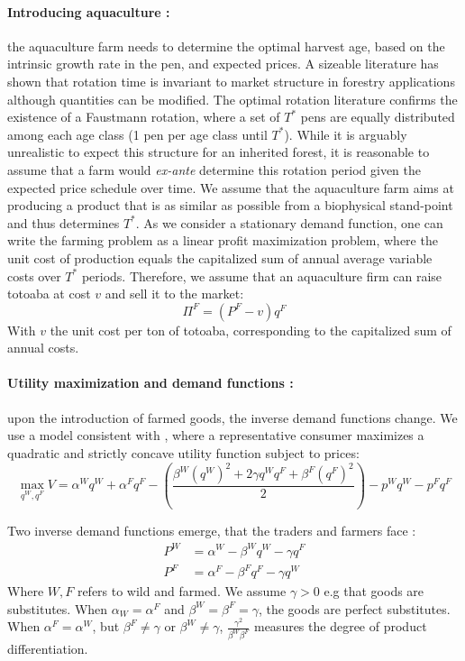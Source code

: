 \paragraph{Introducing aquaculture :}
\label{subsec:aquaculture}
the aquaculture farm needs to determine the optimal harvest age, based on the intrinsic growth rate in the pen, and expected prices. A sizeable literature has shown that rotation time is invariant to market structure in forestry applications \citep{faustmann1849, mitra_faustmann_1986} although quantities can be modified. The optimal rotation literature confirms the existence of a Faustmann rotation, where a set of $T^*$ pens are equally distributed among each age class (1 pen per age class until $T^*$). While it is arguably unrealistic to expect this structure for an inherited forest, it is reasonable to assume that a farm would \textit{ex-ante} determine this rotation period given the expected price schedule over time. We assume that the aquaculture farm aims at producing a product that is as similar as possible from a biophysical stand-point and thus determines $T^*$.
As we consider a stationary demand function, one can write the farming problem as a linear profit maximization problem, where the unit cost of production equals the capitalized sum of annual average variable costs over $T^*$ periods. 
Therefore, we assume that an aquaculture firm can raise totoaba at cost $v$ and sell it to the market: 
\begin{equation}
    \Pi^F = (P^F- v)q^F
    \label{eq:profit_aquaculture}
\end{equation}
With $v$ the unit cost per ton of totoaba, corresponding to the capitalized sum of annual costs. 
%
\paragraph{Utility maximization and demand functions :}
upon the introduction of farmed goods, the inverse demand functions change. 
We use a model consistent with \citep{singh_price_1984}, where a representative consumer maximizes  a quadratic and strictly concave utility function subject to prices: 
\begin{equation}
    \max_{q^W, q^F}V = \alpha^W q^W + \alpha^F q^F - \left(\frac{\beta^W (q^W)^2 + 2\gamma q^W q^F +\beta^F (q^F)^2}{2}\right) - p^Wq^W - p^Fq^F
\end{equation}

Two inverse demand functions emerge, that the traders and farmers face : 
\begin{align}
P^W &= \alpha^W- \beta^W q^W - \gamma q^F \label{eq:demand_wild}\\
P^F &= \alpha^F
 - \beta^F q^F - \gamma q^W \label{eq:demand_farmed}
\end{align}
Where $W, F$ refers to wild and farmed. We assume $\gamma>0$ e.g that goods are substitutes. When $\alpha_W = \alpha^F$ and $\beta^W = \beta^F = \gamma$, the goods are perfect substitutes. When $\alpha^F = \alpha^W$, but $\beta^F \neq \gamma$ or $\beta^W \neq \gamma$,  $\frac{\gamma^2}{\beta^W \beta^F}$ measures the degree of product differentiation. 


